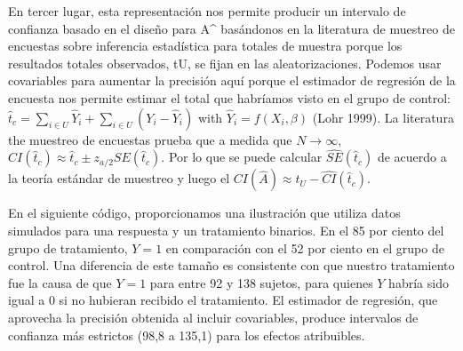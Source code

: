 \documentclass[
]{article}
\begin{document}
En tercer lugar, esta representación nos permite producir un intervalo
de confianza basado en el diseño para A\^{} basándonos en la literatura
de muestreo de encuestas sobre inferencia estadística para totales de
muestra porque los resultados totales observados, tU, se fijan en las
aleatorizaciones. Podemos usar covariables para aumentar la precisión
aquí porque el estimador de regresión de la encuesta nos permite estimar
el total que habríamos visto en el grupo de control:
\(\hat{t}_c=\sum_{i\in U}\hat{Y}_i+\sum_{i\in U}(Y_i-\hat{Y}_i)\) with
\(\hat{Y}_i=f(X_i,\beta)\) (Lohr 1999). La literatura the muestreo de
encuestas prueba que a medida que \(N\rightarrow \infty\),
\(CI(\hat{t}_c) \approx \hat{t}_c \pm z_{a/2}SE(\hat{t}_c)\). Por lo que
se puede calcular \(\widehat{SE}(\hat{t}_c)\) de acuerdo a la teoría
estándar de muestreo y luego el
\(CI(\hat{A}) \approx t_U-\widehat{CI}(\hat{t}_c)\).

En el siguiente código, proporcionamos una ilustración que utiliza datos
simulados para una respuesta y un tratamiento binarios. En el 85 por
ciento del grupo de tratamiento, \(Y = 1\) en comparación con el 52 por
ciento en el grupo de control. Una diferencia de este tamaño es
consistente con que nuestro tratamiento fue la causa de que \(Y = 1\)
para entre 92 y 138 sujetos, para quienes \(Y\) habría sido igual a 0 si
no hubieran recibido el tratamiento. El estimador de regresión, que
aprovecha la precisión obtenida al incluir covariables, produce
intervalos de confianza más estrictos (98,8 a 135,1) para los efectos
atribuibles.
\end{document}
